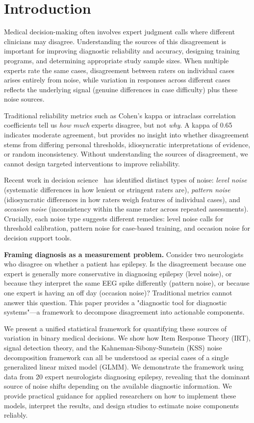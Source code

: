 \documentclass[num-refs]{wiley-article}
\begin{document}
\section*{Introduction}

{\label{707961}}

Medical decision-making often involves expert judgment calls where different clinicians may disagree. Understanding the sources of this disagreement is important for improving diagnostic reliability and accuracy, designing training programs, and determining appropriate study sample sizes. When multiple experts rate the same cases, disagreement between raters on individual cases arises entirely from noise, while variation in responses across different cases reflects the underlying signal (genuine differences in case difficulty) plus these noise sources.

Traditional reliability metrics such as Cohen's kappa or intraclass correlation coefficients tell us \textit{how much} experts disagree, but not \textit{why}. A kappa of 0.65 indicates moderate agreement, but provides no insight into whether disagreement stems from differing personal thresholds, idiosyncratic interpretations of evidence, or random inconsistency. Without understanding the sources of disagreement, we cannot design targeted interventions to improve reliability.

Recent work in decision science~\cite{Kahneman2021} has identified distinct types of noise: \textit{level noise} (systematic differences in how lenient or stringent raters are), \textit{pattern noise} (idiosyncratic differences in how raters weigh features of individual cases), and \textit{occasion noise} (inconsistency within the same rater across repeated assessments). Crucially, each noise type suggests different remedies: level noise calls for threshold calibration, pattern noise for case-based training, and occasion noise for decision support tools.

\textbf{Framing diagnosis as a measurement problem.} Consider two neurologists who disagree on whether a patient has epilepsy. Is the disagreement because one expert is generally more conservative in diagnosing epilepsy (level noise), or because they interpret the same EEG spike differently (pattern noise), or because one expert is having an off day (occasion noise)? Traditional metrics cannot answer this question. This paper provides a "diagnostic tool for diagnostic systems"---a framework to decompose disagreement into actionable components.

We present a unified statistical framework for quantifying these sources of variation in binary medical decisions. We show how Item Response Theory (IRT), signal detection theory, and the Kahneman-Sibony-Sunstein (KSS) noise decomposition framework can all be understood as special cases of a single generalized linear mixed model (GLMM). We demonstrate the framework using data from 20 expert neurologists diagnosing epilepsy, revealing that the dominant source of noise shifts depending on the available diagnostic information. We provide practical guidance for applied researchers on how to implement these models, interpret the results, and design studies to estimate noise components reliably.
\end{document}
